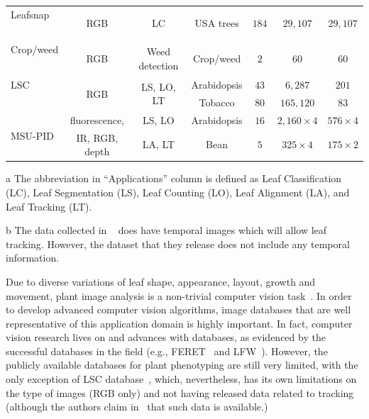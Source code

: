 \begin{table}[t!]
\begin{threeparttable}
\begin{tabular}{l|c|c|c|c|c|c}
Leafsnap & \multirow{2}{*}{RGB} & \multirow{2}{*}{LC} & \multirow{2}{*}{USA trees} & \multirow{2}{*}{$184$} & \multirow{2}{*}{$29,107$} & \multirow{2}{*}{$29,107$} \\
~\cite{kumar2012leafsnap} & & & & & & \\ \hline
Crop/weed & \multirow{2}{*}{RGB} & \multirow{2}{*}{Weed detection} & \multirow{2}{*}{Crop/weed} & \multirow{2}{*}{$2$} & \multirow{2}{*}{$60$} & \multirow{2}{*}{$60$} \\
~\cite{haug2014crop} & & & & & & \\ \hline
LSC & \multirow{2}{*}{RGB} & \multirow{2}{*}{LS, LO, LT\tnote{b}} & Arabidopsis & $43$ & $6,287$ & $201$ \\ \cline{4-7}
~\cite{scharr2014annotated} & & & Tobacco & $80$ & $165,120$ & $83$ \\ \hline
\multirow{2}{*}{MSU-PID} & fluorescence, & LS, LO & Arabidopsis & $16$ & $2,160\times 4$ & $576\times 4$ \\ \cline{4-7}
& IR, RGB, depth & LA, LT & Bean & $5$ & $325\times 4$ & $175\times 2$ \\ \hline
\hline
\end{tabular}
\begin{tablenotes}
\footnotesize
\item[a] The abbreviation in ``Applications'' column is defined as Leaf Classification (LC), Leaf Segmentation (LS), Leaf Counting (LO), Leaf Alignment (LA), and Leaf Tracking (LT).
\item[b] The data collected in ~\cite{scharr2014annotated} does have temporal images which will allow leaf tracking. However, the dataset that they release does not include any temporal information.
\end{tablenotes}
\end{threeparttable}
\label{tab:database}
\end{table}

Due to diverse variations of leaf shape, appearance, layout, growth and movement, plant image analysis is a non-trivial computer vision task~\cite{Minervini2015}.
In order to develop advanced computer vision algorithms, image databases that are well representative of this application domain is highly important.
In fact, computer vision research lives on and advances with databases, as evidenced by the successful databases in the field (e.g., FERET~\cite{Phillips2000} and LFW~\cite{LFW}).
However, the publicly available databases for plant phenotyping are still very limited, with the only exception of LSC database~\cite{scharr2014annotated}, which, nevertheless, has its own limitations on the type of images (RGB only) and not having released data related to tracking (although the authors claim in~\cite{scharr2014annotated} that such data is available.)


